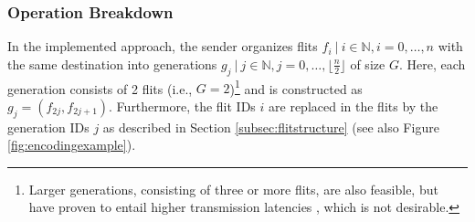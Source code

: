 \subsubsection{Operation Breakdown}
In the implemented approach, the sender organizes flits $f_i\ |\ i \in \mathbb{N}, i = 0, …, n$ with the same destination into generations $g_j\ |\ j
\in \mathbb{N}, j = 0, …, \lfloor\frac{n}{2}\rfloor$ of size $G$. Here, each generation consists of 2 flits (i.e., $G = 2$)\footnote{Larger
generations, consisting of three or more flits, are also feasible, but have proven to entail higher transmission latencies \cite[2]{moriam18activeattackers}, which
is not desirable.} and is constructed as $g_j = (f_{2j}, f_{2j+1})$. Furthermore, the flit IDs $i$ are replaced in the flits by the generation IDs $j$
as described in Section \ref{subsec:flitstructure} (see also Figure \vref{fig:encodingexample}).

